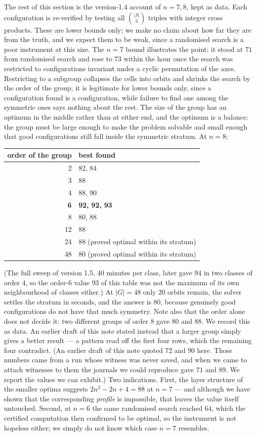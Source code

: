 \documentclass[11pt,a4paper]{article}
\begin{document}
The rest of this section is the version-1.4 account of $n=7,8$, kept as data.  Each configuration is re-verified by testing all $\binom{|S|}{3}$ triples with integer cross products.  These
are lower bounds only; we make no claim about how far they are from the truth, and we expect them to be weak,
since a randomised search is a poor instrument at this size.  The $n=7$ bound illustrates the point: it stood
at $71$ from randomised search and rose to $73$ within the hour once the search was restricted to
configurations invariant under a cyclic permutation of the axes.  Restricting to a subgroup collapses the cells
into orbits and shrinks the search by the order of the group; it is legitimate for lower bounds only, since a
configuration found is a configuration, while failure to find one among the symmetric ones says nothing about
the rest.  The size of the group has an optimum in the middle rather than at either end, and the optimum is a balance:
the group must be large enough to make the problem solvable and small enough that good configurations still
fall inside the symmetric stratum.  At $n=8$:
\begin{center}\begin{tabular}{rl}\toprule
order of the group & best found\\\midrule
2 & 82, 84\\ 3 & 88\\ 4 & 88, 90\\ \textbf{6} & \textbf{92, 92, 93}\\ 8 & 80, 88\\ 12 & 88\\
24 & 88 (proved optimal within its stratum)\\ 48 & 80 (proved optimal within its stratum)\\\bottomrule
\end{tabular}\end{center}
(The full sweep of version 1.5, $40$ minutes per class, later gave $94$ in two classes of order $4$, so the
order-$6$ value $93$ of this table was not the maximum of its own neighbourhood of classes either.)
At $|G|=48$ only $20$ orbits remain, the solver settles the stratum in seconds, and the answer is $80$, because
genuinely good configurations do not have that much symmetry.  Note also that the order alone does not decide
it: two different groups of order $8$ gave $80$ and $88$.  We record this as data.  An earlier draft of this
note stated instead that a larger group simply gives a better result --- a pattern read off the first four
rows, which the remaining four contradict.  (An earlier draft of this note quoted
$72$ and $90$ here.  Those numbers came from a run whose witness was never saved, and when we came to attach
witnesses to them the journals we could reproduce gave $71$ and $89$.  We report the values we can exhibit.)
Two indications.  First, the layer structure of
the smaller optima suggests $2n^2-2n+4=88$ at $n=7$ --- and although we have shown that the corresponding
\emph{profile} is impossible, that leaves the value itself untouched.  Second, at $n=6$ the same randomised
search reached $64$, which the certified computation then confirmed to be optimal, so the instrument is not
hopeless either; we simply do not know which case $n=7$ resembles.
\end{document}
